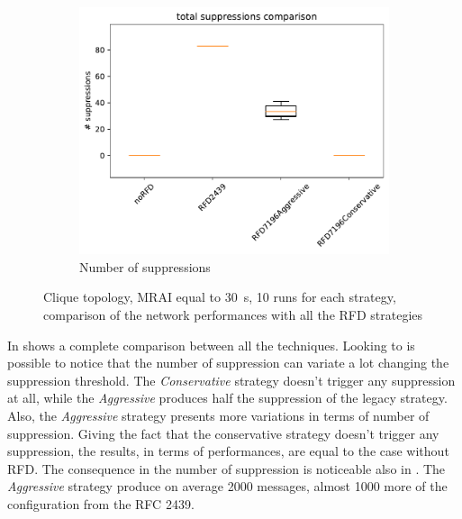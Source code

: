 \begin{figure}[h]
\begin{subfigure}[b]{0.49\textwidth}
     \end{subfigure}
     \hfill
     \begin{subfigure}[b]{0.49\textwidth}
         \centering
         \includegraphics[width=\textwidth]{images/RFD/clique/clique_rfd_comparison_suppressions_boxplot.pdf}
         \caption{Number of suppressions}
         \label{fig:RFD_clique_MRAI30_suppressions}
     \end{subfigure}
		\caption{Clique topology, \ac{MRAI} equal to \SI{30}{\second}, \num{10}
				runs for each strategy,
				comparison of the network performances with all the \ac{RFD} strategies}
        \label{fig:RFD_MRAI30}
\end{figure}

In  shows a complete comparison between all
the techniques.
Looking to  is possible to notice that
the number of suppression can variate a lot changing the suppression threshold.
The \textit{Conservative} strategy doesn't trigger any suppression at all, while
the \textit{Aggressive} produces half the suppression of the legacy strategy.
Also, the \textit{Aggressive} strategy presents more variations in terms of
number of suppression.
Giving the fact that the conservative strategy doesn't trigger any suppression,
the results, in terms of performances, are equal to the case without \ac{RFD}.
The consequence in the number of suppression is noticeable also in
.
The \textit{Aggressive} strategy produce on average \num{2000} messages, almost
\num{1000} more of the configuration from the \ac{RFC} \num{2439}.

